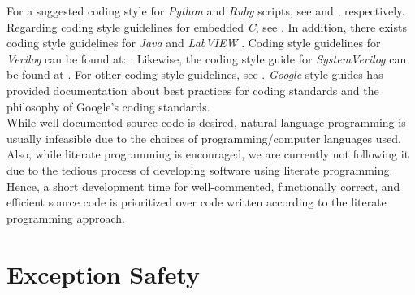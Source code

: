 \documentclass[letter,12pt]{article}
\begin{document}
For a suggested coding style for {\it Python} and {\it Ruby} scripts, see \cite{Osborne2018b,vanRossum2013} and \cite{Macdonald20XY}, respectively. Regarding coding style guidelines for embedded {\it C}, see \cite{Barr2013,Labrosse1999}. In addition, there exists coding style guidelines for {\it Java} \cite{OracleCorporationStaff20XYa,Smith2003,OracleCorporationStaff2016b,OracleCorporationStaff2016,OracleCorporationStaff20XY,Long1995,Carrano2012} and {\it LabVIEW} \cite{Blume2007a,Conway2003}. Coding style guidelines for {\it Verilog} can be found at: \cite{Bening2001,Bening2000}. Likewise, the coding style guide for {\it SystemVerilog} can be found at \cite{Mintz2007}. For other coding style guidelines, see \cite{Wolf20XY,Cady2017,IntelCorporationStaff2015,Schneider2013a,Weatherwax2008,Laplante2012,McConnell2004,Feathers2005,Koopman2010,Valvano2007,Fingeroff2010,Shore2008,Schach2007,Kernighan1982}. {\it Google} style guides \cite{GoogleStyleguideContributors2019} has provided documentation about best practices \cite{Osborne2018a} for coding standards and the philosophy \cite{Osborne2018} of Google's coding standards. \\




While well-documented source code is desired, natural language programming \cite{WikipediaContributors2016i} is usually infeasible due to the choices of programming/computer languages used. Also, while literate programming \cite{Knuth1984,Knuth1992a,McConnell2004,Subramaniam2006,Schach2007,Oram2007,MullerHannemann2010}
 is encouraged, we are currently not following it due to the tedious process of developing software using literate programming. Hence, a short development time for well-commented, functionally correct, and efficient source code is prioritized over code written according to the literate programming approach.


\section{Exception Safety}
\label{sec:ExceptionSafety}
\end{document}
